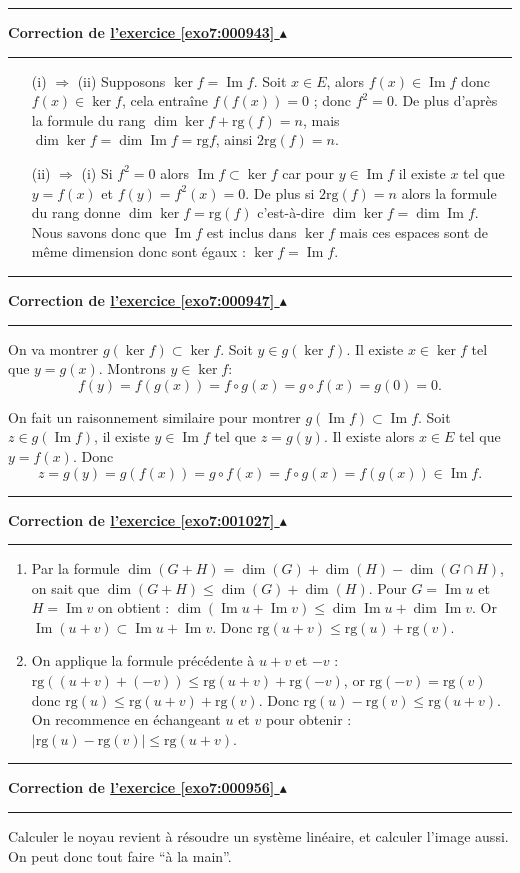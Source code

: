 \documentclass[11pt,a4paper]{article}
\renewcommand{\Im}{\mathop{\mathrm{Im}}\nolimits}
\newcounter{exo}
\newcommand{\correction}[1]{\hypertarget{cor7:#1}{}\label{cor7:#1}{\bf Correction de \hyperlink{exo7:#1}{l'exercice \ref{exo7:#1} $\blacktriangle$}}\vspace{1mm}\hrule\vspace{1mm}}
\newcommand{\fincorrection}{\vspace{1mm}\hrule\vspace*{7mm}}
\begin{document}
\fincorrection
\correction{000943}
\begin{itemize}
  \item[(i) $\Rightarrow$ (ii)] Supposons
$\ker f = \Im f$. Soit $x\in E$, alors $f(x) \in \Im f$ donc $f(x)
\in \ker f$, cela entraîne $f(f(x)) = 0$ ; donc $f^2=0$. De plus
d'apr\`es la formule du rang $\dim \ker f + \text{rg}  (f) = n$, mais $\dim
\ker f = \dim \Im f = \text{rg}  f$, ainsi $2\text{rg}  (f)=n$.
  \item[(ii) $\Rightarrow$ (i)] Si $f^2 = 0$ alors
$\Im f \subset \ker f$ car pour $y\in \Im f$ il existe $x$ tel que
$y=f(x)$ et $f(y)=f^2(x)=0$. De plus si $2 \text{rg}  (f) = n$ alors la
formule du rang donne $\dim \ker f = \text{rg}  (f)$ c'est-\`a-dire $\dim \ker f =
\dim \Im f$. Nous savons donc que $\Im f$ est inclus dans $\ker f$
mais ces espaces sont de m\^eme dimension donc sont \'egaux :
$\ker f = \Im f$.
 \end{itemize}
\fincorrection
\correction{000947}
On va montrer $g(\ker f) \subset \ker f$.
Soit $y \in g(\ker f)$. Il existe $x\in \ker f$ tel que $y=g(x)$.
Montrons $y\in \ker f$:
$$f(y)=f(g(x))=f\circ g (x) = g\circ f(x) = g(0)=0.$$

\bigskip

On fait un raisonnement similaire pour montrer $g(\Im f) \subset \Im f$.
Soit $z\in g(\Im f)$, il existe $y \in \Im f$ tel que $z=g(y)$. Il existe alors $x\in E$ tel que $y=f(x)$.
Donc 
$$z=g(y)=g(f(x))=g\circ f(x)= f\circ g (x) = f(g(x)) \in \Im f.$$

\fincorrection
\correction{001027}
\begin{enumerate}
  \item Par la formule $\dim(G+H) = \dim(G)+\dim(H)-
\dim(G\cap H)$, on sait que $\dim(G+H) \leqslant \dim(G)+\dim(H)$.
Pour $G=\Im u$ et $H=\Im v$ on obtient :
$\dim (\Im u+\Im v) \leqslant \dim \Im u +\dim \Im v$.
Or $\Im (u+v) \subset \Im u+\Im v$.
Donc $\text{rg} (u + v) \leq \text{rg} (u) + \text{rg} (v)$.
  \item On applique la formule pr\'ec\'edente \`a $u+v$ et $-v$ :
$\text{rg}  ((u+v)+(-v)) \leqslant \text{rg}  (u+v)+\text{rg} (-v)$, or $\text{rg} (-v)=\text{rg} (v)$
donc $\text{rg} (u) \leqslant \text{rg} (u+v)+\text{rg} (v)$.
Donc $\text{rg} (u)-\text{rg} (v)\leqslant \text{rg} (u+v)$.
On recommence en \'echangeant $u$ et $v$ pour obtenir :
$\left|\text{rg} (u) - \text{rg} (v)\right| \leq \text{rg} (u + v)$.
\end{enumerate}
\fincorrection
\correction{000956}
Calculer le noyau revient à résoudre un système linéaire,
et calculer l'image aussi. On peut donc tout faire ``à la main''.
\end{document}
